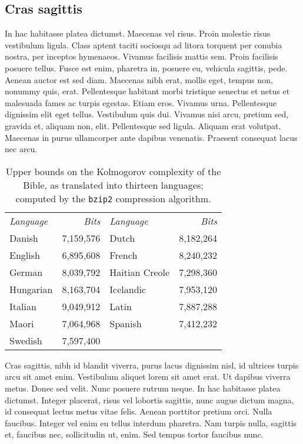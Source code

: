 \documentclass{cascadilla}
\begin{document}
\subsection{Cras sagittis}
In hac habitasse platea dictumst. Maecenas vel risus. Proin molestie risus
vestibulum ligula. Class aptent taciti sociosqu ad litora torquent per conubia
nostra, per inceptos hymenaeos. Vivamus facilisis mattis sem. Proin facilisis
posuere tellus. Fusce est enim, pharetra in, posuere eu, vehicula sagittis,
pede. Aenean auctor est sed diam. Maecenas nibh erat, mollis eget, tempus non,
nonummy quis, erat. Pellentesque habitant morbi tristique senectus et netus et
malesuada fames ac turpis egestas. Etiam eros. Vivamus urna. Pellentesque
dignissim elit eget tellus. Vestibulum quis dui. Vivamus nisi arcu, pretium
sed, gravida et, aliquam non, elit. Pellentesque sed ligula. Aliquam erat
volutpat. Maecenas in purus ullamcorper ante dapibus venenatis. Praesent
consequat lacus nec arcu.

\begin{table}
    \centering
    \begin{tabular}{lrlr}
        \emph{Language} & \emph{Bits}& \emph{Language} &
            \emph{Bits}\\
        Danish&7,159,576 &
        Dutch&8,182,264  \\
        English&6,895,608 &
        French&8,240,232  \\
        German&8,039,792 &
        Haitian Creole&7,298,360  \\
        Hungarian&8,163,704 &
        Icelandic&7,953,120  \\
        Italian&9,049,912 &
        Latin&7,887,288  \\
        Maori&7,064,968 &
        Spanish&7,412,232  \\
        Swedish&7,597,400
    \end{tabular}
    \caption{Upper bounds on the Kolmogorov complexity of the Bible, as
    translated into thirteen languages; computed by the \texttt{bzip2}
    compression algorithm.}
    \label{Bzip2}
\end{table}

Cras sagittis, nibh id blandit viverra, purus lacus dignissim nisl, id
ultrices turpis arcu sit amet enim. Vestibulum aliquet lorem sit amet erat. Ut
dapibus viverra metus. Donec sed velit. Nunc posuere rutrum neque. In hac
habitasse platea dictumst. Integer placerat, risus vel lobortis sagittis, nunc
augue dictum magna, id consequat lectus metus vitae felis. Aenean porttitor
pretium orci. Nulla faucibus. Integer vel enim eu tellus interdum pharetra.
Nam turpis nulla, sagittis et, faucibus nec, sollicitudin ut, enim. Sed tempus
tortor faucibus nunc.
\end{document}
